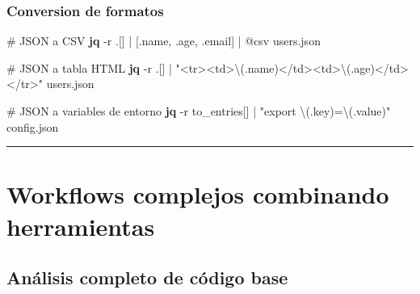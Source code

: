 \documentclass[
  11pt,
  letterpaper,
  oneside,
  openany]{scrbook}
\newenvironment{Shaded}{}{}
\newcommand{\AttributeTok}[1]{\textcolor[rgb]{0.84,0.23,0.29}{#1}}
\newcommand{\CommentTok}[1]{\textcolor[rgb]{0.42,0.45,0.49}{#1}}
\newcommand{\ExtensionTok}[1]{\textcolor[rgb]{0.84,0.23,0.29}{\textbf{#1}}}
\newcommand{\NormalTok}[1]{\textcolor[rgb]{0.14,0.16,0.18}{#1}}
\newcommand{\StringTok}[1]{\textcolor[rgb]{0.01,0.18,0.38}{#1}}
\begin{document}
\subsubsection{Conversion de formatos}\label{conversion-de-formatos}

\begin{Shaded}
\begin{Highlighting}[]
\CommentTok{\# JSON a CSV}
\ExtensionTok{jq} \AttributeTok{{-}r} \StringTok{\textquotesingle{}.[] | [.name, .age, .email] | @csv\textquotesingle{}}\NormalTok{ users.json}

\CommentTok{\# JSON a tabla HTML}
\ExtensionTok{jq} \AttributeTok{{-}r} \StringTok{\textquotesingle{}.[] | "\textless{}tr\textgreater{}\textless{}td\textgreater{}\textbackslash{}(.name)\textless{}/td\textgreater{}\textless{}td\textgreater{}\textbackslash{}(.age)\textless{}/td\textgreater{}\textless{}/tr\textgreater{}"\textquotesingle{}}\NormalTok{ users.json}

\CommentTok{\# JSON a variables de entorno}
\ExtensionTok{jq} \AttributeTok{{-}r} \StringTok{\textquotesingle{}to\_entries[] | "export \textbackslash{}(.key)=\textbackslash{}(.value)"\textquotesingle{}}\NormalTok{ config.json}
\end{Highlighting}
\end{Shaded}

\begin{center}\rule{0.5\linewidth}{0.5pt}\end{center}

\section{Workflows complejos combinando
herramientas}\label{workflows-complejos-combinando-herramientas}

\subsection{Análisis completo de código
base}\label{anuxe1lisis-completo-de-cuxf3digo-base}
\end{document}
